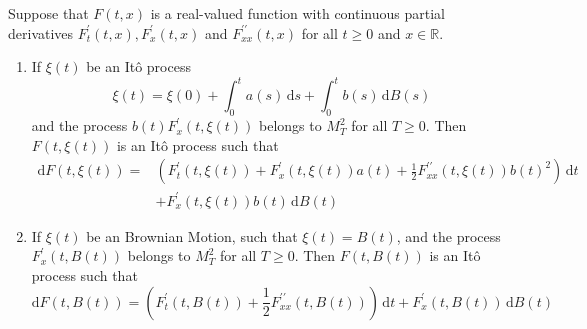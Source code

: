 \begin{theorem}[It\^o Formula]
    Suppose that $F(t,x)$ is a real-valued function with continuous partial derivatives $F_{t}^{\prime}(t,x),F_{x}^{\prime}(t,x)$ and $F_{xx}^{\prime\prime}(t,x)$ for all $t\geq 0$ and $x\in\mathbb{R}$.

    \begin{enumerate}
        \item If $\xi(t)$ be an It\^o process
              \begin{equation*}
                  \xi(t)=\xi(0)+\int_{0}^{t}a(s)\,\mathrm{d}s+\int_{0}^{t}b(s)\,\mathrm{d}B(s)
              \end{equation*}
              and the process $b(t)F_{x}^{\prime}(t,\xi(t))$ belongs to $M_{T}^{2}$ for all $T\geq 0$. Then $F(t,\xi(t))$ is an It\^o process such that
              \begin{equation}
                  \begin{aligned}
                      \mathrm{d}F(t,\xi(t))= & \left(F_{t}^{\prime}(t,\xi(t))+F_{x}^{\prime}(t,\xi(t))a(t)+\frac{1}{2}F_{xx}^{\prime\prime}(t,\xi(t))b(t)^{2}\right)\,\mathrm{d}t \\
                                             & +F_{x}^{\prime}(t,\xi(t))b(t)\,\mathrm{d}B(t)
                  \end{aligned}
              \end{equation}
        \item If $\xi(t)$ be an Brownian Motion, such that $\xi(t)=B(t)$, and the process $F_{x}^{\prime}(t,B(t))$ belongs to $M_{T}^{2}$ for all $T \geq 0$. Then $F(t,B(t))$ is an It\^o process such that
              \begin{equation}
                  \mathrm{d}F(t,B(t))=\left(F_{t}^{\prime}(t,B(t))+\frac{1}{2}F_{xx}^{\prime\prime}(t,B(t))\right)\,\mathrm{d}t+F_{x}^{\prime}(t,B(t))\,\mathrm{d}B(t)
              \end{equation}
    \end{enumerate}
\end{theorem}

\begin{example}

\end{example}

\begin{example}

\end{example}

\begin{example}

\end{example}